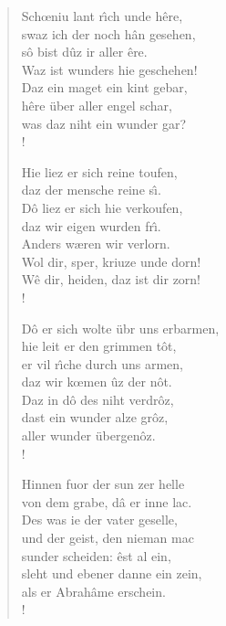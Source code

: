 \documentclass[11pt]{article}
\begin{document}
\begin{verse}
\begin{multicols}{2}
%
%
\begin{stanza}
Sch\oe niu lant r\^\i ch unde h\^ere, \\
swaz ich der noch h\^an gesehen, \\
s\^o bist d\^uz ir aller \^ere. \\
Waz ist wunders hie geschehen! \\
Daz ein maget ein kint gebar, \\
h\^ere \"uber aller engel schar, \\
was daz niht ein wunder gar?\\!
\end{stanza}
%
%
\begin{stanza}
Hie liez er sich reine toufen, \\
daz der mensche reine s\^\i. \\
D\^o liez er sich hie verkoufen, \\
daz wir eigen wurden fr\^\i. \\
Anders w\ae ren wir verlorn. \\
Wol dir, sper, kriuze unde dorn! \\
W\^e dir, heiden, daz ist dir zorn!\\!
\end{stanza}
%
%
\begin{stanza}
D\^o er sich wolte \"ubr uns erbarmen, \\
hie leit er den grimmen t\^ot, \\
er vil r\^\i che durch uns armen, \\
daz wir k\oe men \^uz der n\^ot. \\
Daz in d\^o des niht verdr\^oz, \\
dast ein wunder alze gr\^oz, \\
aller wunder \"ubergen\^oz. \\!
\end{stanza} 
%
%
\begin{stanza}
Hinnen fuor der sun zer helle\\
von dem grabe, d\^a er inne lac.\\
Des was ie der vater geselle,\\
und der geist, den nieman mac\\
sunder scheiden: \^est al ein,\\
sleht und ebener danne ein zein,\\
als er Abrah\^ame erschein.\\!
\end{stanza} 
%

\end{multicols}
\end{verse}
\end{document}
